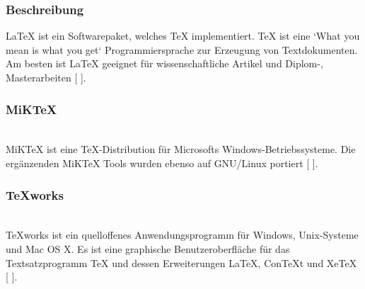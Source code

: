 \documentclass[FIPLY_base.tex]{subfiles}
\begin{document}
\subsubsection{Beschreibung}
LaTeX ist ein Softwarepaket, welches TeX implementiert. TeX ist eine `What you mean is what you get` Programmiersprache zur Erzeugung von Textdokumenten. Am besten ist LaTeX geeignet für wissenschaftliche Artikel und Diplom-, Masterarbeiten [ \cite{lxLatex}].

\subsubsection{MiKTeX}\ \\
MiKTeX ist eine TeX-Distribution für Microsofts Windows-Betriebssysteme. Die ergänzenden MiKTeX Tools wurden ebenso auf GNU/Linux portiert [ \cite{lxMiktex}].

\subsubsection{TeXworks}\ \\
TeXworks ist ein quelloffenes Anwendungsprogramm für Windows, Unix-Systeme und Mac OS X. Es ist eine graphische Benutzeroberfläche für das Textsatzprogramm TeX und dessen Erweiterungen LaTeX, ConTeXt und XeTeX [ \cite{lxTexworks}].
\end{document}
